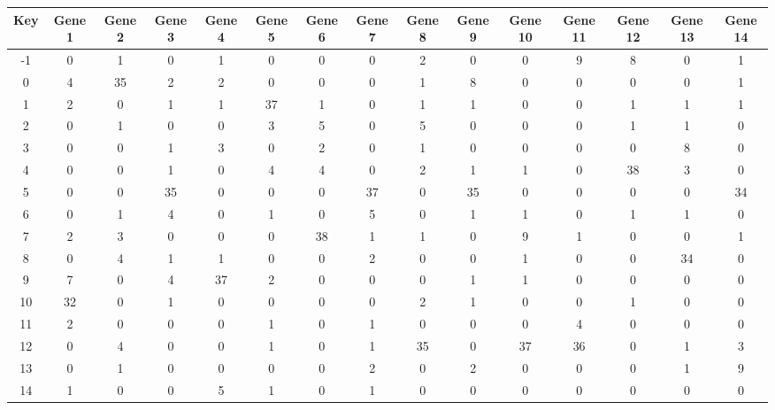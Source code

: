 \begin{tabular}{|c|c|c|c|c|c|c|c|c|c|c|c|c|c|c|}
\hline
Key & Gene 1 & Gene 2 & Gene 3 & Gene 4 & Gene 5 & Gene 6 & Gene 7 & Gene 8 & Gene 9 & Gene 10 & Gene 11 & Gene 12 & Gene 13 & Gene 14 \\
\hline
-1 & 0 & 1 & 0 & 1 & 0 & 0 & 0 & 2 & 0 & 0 & 9 & 8 & 0 & 1 \\
0 & 4 & 35 & 2 & 2 & 0 & 0 & 0 & 1 & 8 & 0 & 0 & 0 & 0 & 1 \\
1 & 2 & 0 & 1 & 1 & 37 & 1 & 0 & 1 & 1 & 0 & 0 & 1 & 1 & 1 \\
2 & 0 & 1 & 0 & 0 & 3 & 5 & 0 & 5 & 0 & 0 & 0 & 1 & 1 & 0 \\
3 & 0 & 0 & 1 & 3 & 0 & 2 & 0 & 1 & 0 & 0 & 0 & 0 & 8 & 0 \\
4 & 0 & 0 & 1 & 0 & 4 & 4 & 0 & 2 & 1 & 1 & 0 & 38 & 3 & 0 \\
5 & 0 & 0 & 35 & 0 & 0 & 0 & 37 & 0 & 35 & 0 & 0 & 0 & 0 & 34 \\
6 & 0 & 1 & 4 & 0 & 1 & 0 & 5 & 0 & 1 & 1 & 0 & 1 & 1 & 0 \\
7 & 2 & 3 & 0 & 0 & 0 & 38 & 1 & 1 & 0 & 9 & 1 & 0 & 0 & 1 \\
8 & 0 & 4 & 1 & 1 & 0 & 0 & 2 & 0 & 0 & 1 & 0 & 0 & 34 & 0 \\
9 & 7 & 0 & 4 & 37 & 2 & 0 & 0 & 0 & 1 & 1 & 0 & 0 & 0 & 0 \\
10 & 32 & 0 & 1 & 0 & 0 & 0 & 0 & 2 & 1 & 0 & 0 & 1 & 0 & 0 \\
11 & 2 & 0 & 0 & 0 & 1 & 0 & 1 & 0 & 0 & 0 & 4 & 0 & 0 & 0 \\
12 & 0 & 4 & 0 & 0 & 1 & 0 & 1 & 35 & 0 & 37 & 36 & 0 & 1 & 3 \\
13 & 0 & 1 & 0 & 0 & 0 & 0 & 2 & 0 & 2 & 0 & 0 & 0 & 1 & 9 \\
14 & 1 & 0 & 0 & 5 & 1 & 0 & 1 & 0 & 0 & 0 & 0 & 0 & 0 & 0 \\
\hline
\end{tabular}